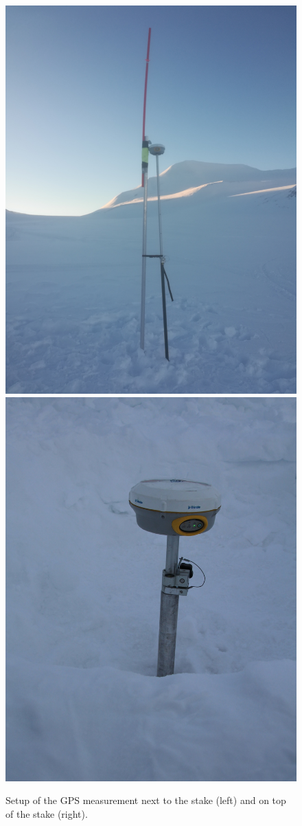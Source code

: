 \begin{figure}[H]
	\centering
	\includegraphics[width=0.48\linewidth]{./figs/pictures/GPS_setup.jpg}
	\includegraphics[width=0.485\linewidth]{./figs/pictures/setup_ontop.JPG}
	\caption{Setup of the GPS measurement next to the stake (left) and on top of the stake (right).}
	\label{GPS:fig:setup}
\end{figure}
